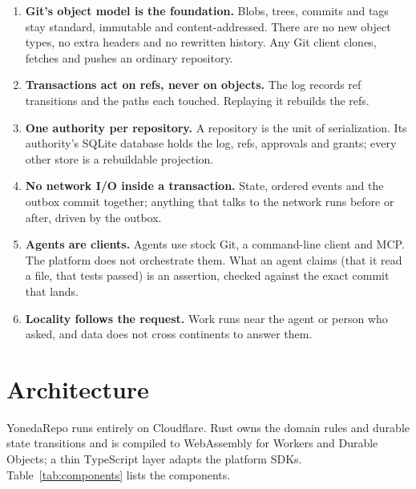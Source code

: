 \documentclass[11pt]{article}
\begin{document}
\begin{enumerate}
\item \textbf{Git's object model is the foundation.} Blobs, trees, commits and tags stay
  standard, immutable and content-addressed. There are no new object types, no extra
  headers and no rewritten history. Any Git client clones, fetches and pushes an
  ordinary repository.
\item \textbf{Transactions act on refs, never on objects.} The log records ref
  transitions and the paths each touched. Replaying it rebuilds the refs.
\item \textbf{One authority per repository.} A repository is the unit of serialization.
  Its authority's SQLite database holds the log, refs, approvals and grants; every
  other store is a rebuildable projection.
\item \textbf{No network I/O inside a transaction.} State, ordered events and the outbox
  commit together; anything that talks to the network runs before or after, driven by
  the outbox.
\item \textbf{Agents are clients.} Agents use stock Git, a command-line client and MCP.
  The platform does not orchestrate them. What an agent claims (that it read a file,
  that tests passed) is an assertion, checked against the exact commit that lands.
\item \textbf{Locality follows the request.} Work runs near the agent or person who
  asked, and data does not cross continents to answer them.
\end{enumerate}

\section{Architecture}
\label{sec:arch}

YonedaRepo runs entirely on Cloudflare. Rust owns the domain rules and durable state
transitions and is compiled to WebAssembly for Workers and Durable Objects; a thin
TypeScript layer adapts the platform SDKs. Table~\ref{tab:components} lists the
components.
\end{document}
